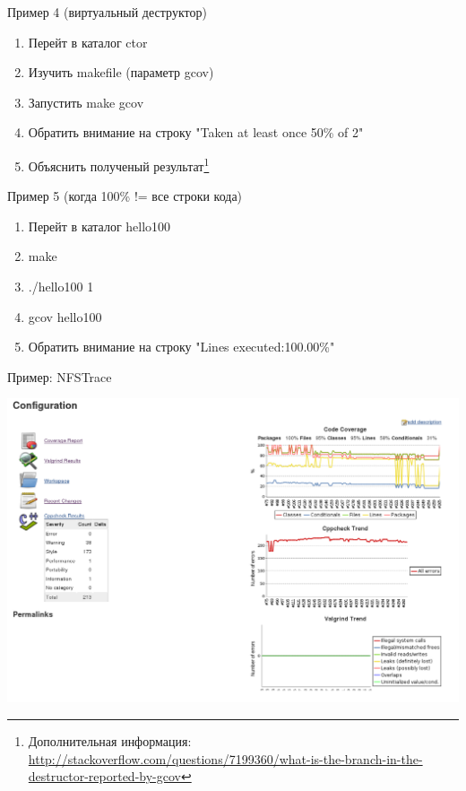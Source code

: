 \begin{frame}{Пример 4 (виртуальный деструктор)}
  \begin{enumerate}
      \item Перейт в каталог ctor
      \item Изучить makefile (параметр gcov)
      \item Запустить make gcov
      \item Обратить внимание на строку "Taken at least once 50\% of 2"
      \item Объяснить полученый результат\footnote{Дополнительная информация: \url{http://stackoverflow.com/questions/7199360/what-is-the-branch-in-the-destructor-reported-by-gcov}}
  \end{enumerate}
\end{frame}

\begin{frame}{Пример 5 (когда 100\% != все строки кода)}
  \begin{enumerate}
      \item Перейт в каталог hello100 
      \item make 
      \item ./hello100 1 
      \item gcov hello100 
      \item Обратить внимание на строку "Lines executed:100.00\%"
  \end{enumerate}
\end{frame}


\begin{frame}{Пример: NFSTrace}
  \begin{center}
    \includegraphics[height=0.9\textheight]{../../slides/profile/nfs-trace-coverage.png}
  \end{center}
\end{frame}

